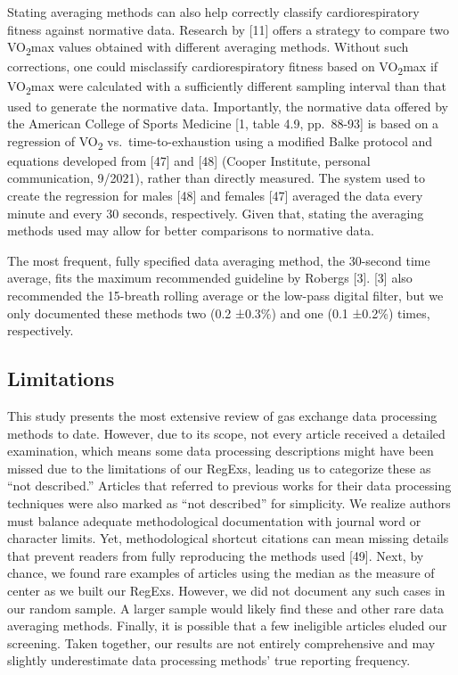 \documentclass[
  letterpaper,
  DIV=11,
  numbers=noendperiod]{scrartcl}
\begin{document}
Stating averaging methods can also help correctly classify
cardiorespiratory fitness against normative data. Research by {[}11{]}
offers a strategy to compare two VO\textsubscript{2}max values obtained
with different averaging methods. Without such corrections, one could
misclassify cardiorespiratory fitness based on VO\textsubscript{2}max if
VO\textsubscript{2}max were calculated with a sufficiently different
sampling interval than that used to generate the normative data.
Importantly, the normative data offered by the American College of
Sports Medicine {[}1, table 4.9, pp.~88-93{]} is based on a regression
of VO\textsubscript{2} vs.~time-to-exhaustion using a modified Balke
protocol and equations developed from {[}47{]} and {[}48{]} (Cooper
Institute, personal communication, 9/2021), rather than directly
measured. The system used to create the regression for males {[}48{]}
and females {[}47{]} averaged the data every minute and every 30
seconds, respectively. Given that, stating the averaging methods used
may allow for better comparisons to normative data.

The most frequent, fully specified data averaging method, the 30-second
time average, fits the maximum recommended guideline by Robergs {[}3{]}.
{[}3{]} also recommended the 15-breath rolling average or the low-pass
digital filter, but we only documented these methods two (0.2 ±0.3\%)
and one (0.1 ±0.2\%) times, respectively.

\subsection{Limitations}\label{limitations}

This study presents the most extensive review of gas exchange data
processing methods to date. However, due to its scope, not every article
received a detailed examination, which means some data processing
descriptions might have been missed due to the limitations of our
RegExs, leading us to categorize these as ``not described.'' Articles
that referred to previous works for their data processing techniques
were also marked as ``not described'' for simplicity. We realize authors
must balance adequate methodological documentation with journal word or
character limits. Yet, methodological shortcut citations can mean
missing details that prevent readers from fully reproducing the methods
used {[}49{]}. Next, by chance, we found rare examples of articles using
the median as the measure of center as we built our RegExs. However, we
did not document any such cases in our random sample. A larger sample
would likely find these and other rare data averaging methods. Finally,
it is possible that a few ineligible articles eluded our screening.
Taken together, our results are not entirely comprehensive and may
slightly underestimate data processing methods' true reporting
frequency.
\end{document}
